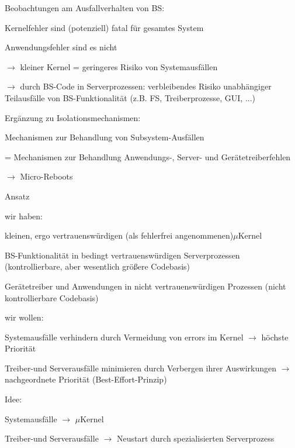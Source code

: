 \documentclass[a4paper]{article}
\begin{document}
\begin{multicols}{3}
    \begin{itemize*}
        \item
        Beobachtungen am Ausfallverhalten von BS:
        \item
        Kernelfehler sind (potenziell) fatal für gesamtes System
        \item
        Anwendungsfehler sind es nicht
        \item
        $\rightarrow$  kleiner Kernel = geringeres Risiko von
        Systemausfällen
        \item
        $\rightarrow$  durch BS-Code in Serverprozessen:
        verbleibendes Risiko unabhängiger Teilausfälle von BS-Funktionalität
        (z.B. FS, Treiberprozesse, GUI, ...)
        \item
        Ergänzung zu Isolationsmechanismen:
        \item
        Mechanismen zur Behandlung von Subsystem-Ausfällen
        \item
        = Mechanismen zur Behandlung Anwendungs-, Server- und
        Gerätetreiberfehlen
        \item
        $\rightarrow$  Micro-Reboots
    \end{itemize*}

    Ansatz

    \begin{itemize*}
        \item
        wir haben:
        \item
        kleinen, ergo vertrauenswürdigen (als fehlerfrei angenommenen)$\mu$Kernel
        \item
        BS-Funktionalität in bedingt vertrauenswürdigen Serverprozessen
        (kontrollierbare, aber wesentlich größere Codebasis)
        \item
        Gerätetreiber und Anwendungen in nicht vertrauenswürdigen Prozessen
        (nicht kontrollierbare Codebasis)
        \item
        wir wollen:
        \item
        Systemausfälle verhindern durch Vermeidung von errors im Kernel
        $\rightarrow$  höchste Priorität
        \item
        Treiber-und Serverausfälle minimieren durch Verbergen ihrer
        Auswirkungen $\rightarrow$  nachgeordnete Priorität
        (Best-Effort-Prinzip)
        \item
        Idee:
        \begin{itemize*}
            \item Systemausfälle $\rightarrow$  $\mu$Kernel
            \item Treiber-und Serverausfälle $\rightarrow$  Neustart durch spezialisierten Serverprozess
        \end{itemize*}
    \end{itemize*}


\end{multicols}
\end{document}
